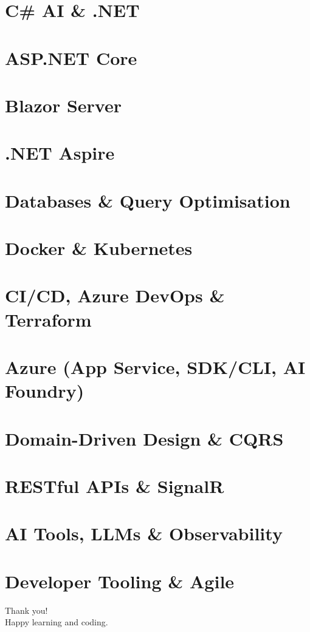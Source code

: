 \documentclass{mybeamer}
\begin{document}
\hypertarget{sec13}{}
\section{C\# AI \& .NET}


\hypertarget{sec14}{}
\section{ASP.NET Core}


\hypertarget{sec15}{}
\section{Blazor Server}


\hypertarget{sec16}{}
\section{.NET Aspire}


\hypertarget{sec17}{}
\section{Databases \& Query Optimisation}


\hypertarget{sec18}{}
\section{Docker \& Kubernetes}


\hypertarget{sec19}{}
\section{CI/CD, Azure DevOps \& Terraform}


\hypertarget{sec20}{}
\section{Azure (App Service, SDK/CLI, AI Foundry)}


\hypertarget{sec21}{}
\section{Domain-Driven Design \& CQRS}


\hypertarget{sec22}{}
\section{RESTful APIs \& SignalR}


\hypertarget{sec23}{}
\section{AI Tools, LLMs \& Observability}


\hypertarget{sec24}{}
\section{Developer Tooling \& Agile}


\begin{frame}
  \centering
  {\Huge Thank you!}\\[0.5em]
  Happy learning and coding.
\end{frame}
\end{document}
